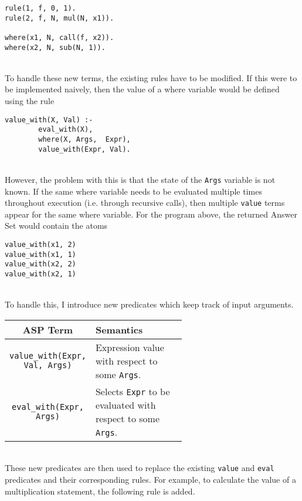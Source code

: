 \begin{lstlisting}
rule(1, f, 0, 1).
rule(2, f, N, mul(N, x1)).

where(x1, N, call(f, x2)).
where(x2, N, sub(N, 1)).
\end{lstlisting}
\mbox{}\\
To handle these new terms, the existing rules have to be modified. If this were to be implemented naively, then the value of a where variable would be defined using the rule \\

\begin{lstlisting}
value_with(X, Val) :- 
		eval_with(X), 
		where(X, Args,  Expr), 
		value_with(Expr, Val).
\end{lstlisting}
\mbox{}\\
However, the problem with this is that the state of the \lstinline!Args! variable is not known. If the same where variable needs to be evaluated multiple times throughout execution (i.e. through recursive calls), then multiple \lstinline!value! terms appear for the same where variable. For the program above, the returned Answer Set would contain the atoms \\

\begin{lstlisting}
value_with(x1, 2)
value_with(x1, 1)
value_with(x2, 2)
value_with(x2, 1)
\end{lstlisting}
\mbox{}\\
To handle this, I introduce new predicates which keep track of input arguments.

\begin{center}
\begin{tabular}{| c | m{0.6\linewidth} |}
\hline
\textbf{ASP Term} & \textbf{Semantics} \\
\hline
\lstinline!value_with(Expr, Val, Args)! 
&
\mbox{}\newline
Expression value with respect to some \lstinline!Args!. \newline
\\
\hline
\lstinline!eval_with(Expr, Args)! 
&
\mbox{}\newline
Selects \lstinline!Expr! to be evaluated with respect to some \lstinline!Args!. \newline
\\
\hline
\end{tabular}
\end{center}
\mbox{}\\
These new predicates are then used to replace the existing \lstinline!value! and \lstinline!eval! predicates and their corresponding rules. For example, to calculate the value of a multiplication statement, the following rule is added.

